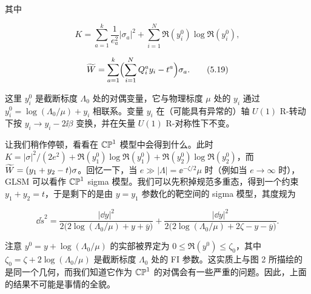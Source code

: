 其中

\begin{equation}
    K=\sum_{a=1}^{k}\frac{1}{e_a^2}|\sigma_a|^2+\sum_{i=1}^{N}\Re(y_i^0)\log\Re(y_i^0),
    \tag{5.18}
\end{equation}

\begin{equation}
    \widetilde{W}=\sum_{a=1}^{k}\Bigl(\sum_{i=1}^{N}Q_i^a y_i-t^a\Bigr)\sigma_a.
    \tag{5.19}
\end{equation}

这里 $y_i^0$ 是截断标度 $\Lambda_0$ 处的对偶变量，它与物理标度 $\mu$ 处的 $y_i$ 通过 $y_i^0=\log(\Lambda_0/\mu)+y_i$ 相联系。变量 $y_i$ 在（可能具有异常的）轴 $U(1)$ R-转动下按 $y_i\to y_i-2\ii\beta$ 变换，并在矢量 $U(1)$ R-对称性下不变。

让我们稍作停顿，看看在 $\mathbb{CP}^1$ 模型中会得到什么。此时 $K=|\sigma|^2/(2e^2)+\Re(y_1^0)\log\Re(y_1^0)+\Re(y_2^0)\log\Re(y_2^0)$，而 $\widetilde{W}=(y_1+y_2-t)\sigma$。回忆一下，当 $e\gg|\Lambda|=\ee^{-\zeta/2}\mu$ 时（例如当 $e\to\infty$ 时），GLSM 可以看作 $\mathbb{CP}^1$ sigma 模型。我们可以先积掉规范多重态，得到一个约束 $y_1+y_2=t$，于是剩下的是由 $y=y_1$ 参数化的靶空间的 sigma 模型，其度规为

\begin{equation}
    \dd\tilde{s}^2=\frac{|\dd y|^2}{2\bigl(2\log(\Lambda_0/\mu)+y+\overline{y}\bigr)}
        +\frac{|\dd y|^2}{2\bigl(2\log(\Lambda_0/\mu)+2\zeta-y-\overline{y}\bigr)}.
    \tag{5.20}
\end{equation}

注意 $y^0=y+\log(\Lambda_0/\mu)$ 的实部被界定为 $0\le\Re(y^0)\le\zeta_0$，其中 $\zeta_0=\zeta+2\log(\Lambda_0/\mu)$ 是截断标度 $\Lambda_0$ 处的 FI 参数。这实质上与图 2 所描绘的是同一个几何，而我们知道它作为 $\mathbb{CP}^1$ 的对偶会有一些严重的问题。因此，上面的结果不可能是事情的全貌。


